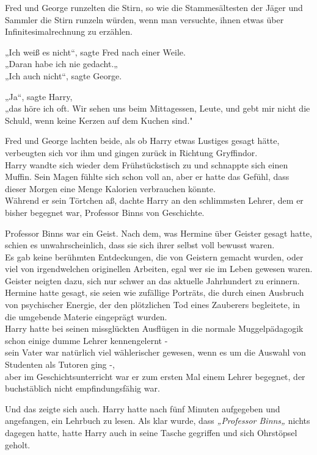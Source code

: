 {Fred und George runzelten die Stirn, so wie die Stammesältesten der Jäger und Sammler die Stirn runzeln würden, wenn man versuchte, ihnen etwas über Infinitesimalrechnung zu erzählen.

„Ich weiß es nicht“, sagte Fred nach einer Weile.\\ „Daran habe ich nie gedacht.„\\ „Ich auch nicht“, sagte George.

„Ja“, sagte Harry,\\ „das höre ich oft. Wir sehen uns beim Mittagessen, Leute, und gebt mir nicht die Schuld, wenn keine Kerzen auf dem Kuchen sind."

Fred und George lachten beide, als ob Harry etwas Lustiges gesagt hätte, verbeugten sich vor ihm und gingen zurück in Richtung Gryffindor.\\ Harry wandte sich wieder dem Frühstückstisch zu und schnappte sich einen Muffin. Sein Magen fühlte sich schon voll an, aber er hatte das Gefühl, dass dieser Morgen eine Menge Kalorien verbrauchen könnte.\\ Während er sein Törtchen aß, dachte Harry an den schlimmsten Lehrer, dem er bisher begegnet war, Professor Binns von Geschichte.

Professor Binns war ein Geist. Nach dem, was Hermine über Geister gesagt hatte, schien es unwahrscheinlich, dass sie sich ihrer selbst voll bewusst waren.\\ Es gab keine berühmten Entdeckungen, die von Geistern gemacht wurden, oder viel von irgendwelchen originellen Arbeiten, egal wer sie im Leben gewesen waren.\\ Geister neigten dazu, sich nur schwer an das aktuelle Jahrhundert zu erinnern. Hermine hatte gesagt, sie seien wie zufällige Porträts, die durch einen Ausbruch von psychischer Energie, der den plötzlichen Tod eines Zauberers begleitete, in die umgebende Materie eingeprägt wurden.\\ Harry hatte bei seinen missglückten Ausflügen in die normale Muggelpädagogik schon einige dumme Lehrer kennengelernt -\\ sein Vater war natürlich viel wählerischer gewesen, wenn es um die Auswahl von Studenten als Tutoren ging -,\\ aber im Geschichtsunterricht war er zum ersten Mal einem Lehrer begegnet, der buchstäblich nicht empfindungsfähig war.

Und das zeigte sich auch. Harry hatte nach fünf Minuten aufgegeben und angefangen, ein Lehrbuch zu lesen. Als klar wurde, dass \emph{„Professor Binns„} nichts dagegen hatte, hatte Harry auch in seine Tasche gegriffen und sich Ohrstöpsel geholt.

}
